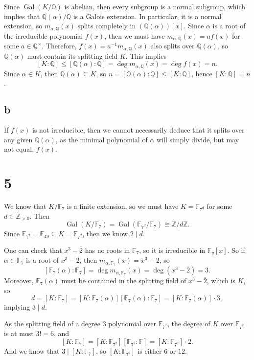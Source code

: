 \documentclass[12pt]{article}
\newcommand{\Z}{\mathbb{Z}}
\newcommand{\Q}{\mathbb{Q}}
\newcommand{\<}{\langle}
\renewcommand{\>}{\rangle}
\newcommand{\isom}{\cong}
\newcommand{\eqc}{\overline}
\newcommand{\clo}{\overline}
\newcommand{\F}{\mathbb{F}}
\DeclareMathOperator{\Gal}{Gal}
\begin{document}
Since $\Gal(K/\Q)$ is abelian, then every subgroup is a normal subgroup, which implies that $\Q(\alpha)/\Q$ is a Galois extension. In particular, it is a normal extension, so $m_{\alpha, \Q}(x)$ splits completely in $(\Q(\alpha))[x]$. Since $\alpha$ is a root of the irreducible polynomial $f(x)$, then we must have $m_{\alpha, \Q}(x) = af(x)$ for some $a \in \Q^\times$. Therefore, $f(x) = a^{-1}m_{\alpha, \Q}(x)$ also splits over $\Q(\alpha)$, so $\Q(\alpha)$ must contain its splitting field $K$. This implies
\[
    [K : \Q] \leq [\Q(\alpha) : \Q] = \deg m_{\alpha, \Q}(x) = \deg f(x) = n.
\]
Since $\alpha \in K$, then $\Q(\alpha) \subseteq K$, so $n = [\Q(\alpha) : \Q] \leq [K : \Q]$, hence $[K : \Q] = n$.

\subsection*{b}

If $f(x)$ is not irreducible, then we cannot necessarily deduce that it splits over any given $\Q(\alpha)$, as the minimal polynomial of $\alpha$ will simply divide, but may not equal, $f(x)$.




\newpage
\section*{5}

We know that $K/\F_7$ is a finite extension, so we must have $K = \F_{7^d}$ for some $d \in \Z_{>0}$. Then
\[
    \Gal(K / \F_7) = \Gal(\F_{7^d}/\F_7) \isom \Z/d\Z.
\]
Since $\F_{7^2} = \F_{49} \subseteq K = \F_{7^d}$, then we know $2 \mid d$.

One can check that $x^3 - \eqc{2}$ has no roots in $\F_7$, so it is irreducible in $\F_y[x]$. So if $\alpha \in \clo{\F_7}$ is a root of $x^3 - \eqc{2}$, then $m_{\alpha, \F_7}(x) = x^3 - \eqc{2}$, so
\[
    [\F_7(\alpha) : \F_7] = \deg m_{\alpha, \F_7}(x) = \deg(x^3 - \eqc{2}) = 3.
\]
Moreover, $\F_7(\alpha)$ must be contained in the splitting field of $x^3 - \eqc{2}$, which is $K$, so
\[
    d = [K : \F_7] = [K : \F_7(\alpha)][\F_7(\alpha) : \F_7] = [K : \F_7(\alpha)] \cdot 3,
\]
implying $3 \mid d$.

As the splitting field of a degree $3$ polynomial over $\F_{7^2}$, the degree of $K$ over $\F_{7^2}$ is at most $3! = 6$, and
\[
    [K : \F_7] = [K : \F_{7^2}][\F_{7^2} : \F] = [K : \F_{7^2}] \cdot 2.
\]
And we know that $3 \mid [K : \F_7]$, so $[K : \F_{7^2}]$ is either $6$ or $12$.
\end{document}
